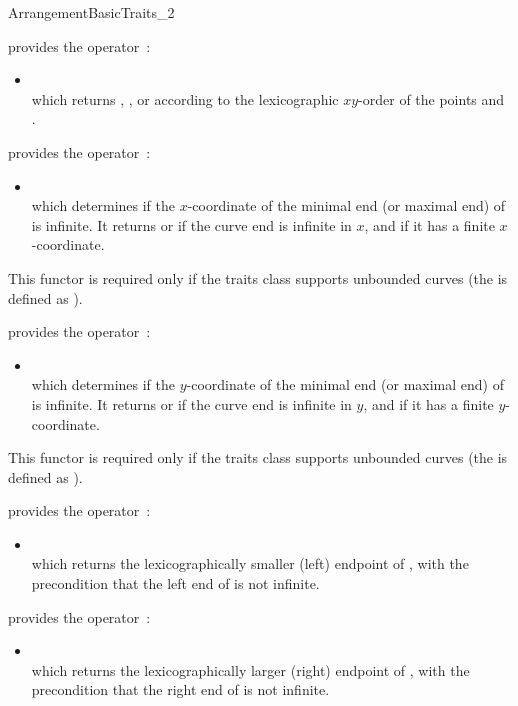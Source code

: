 \begin{ccRefConcept}{ArrangementBasicTraits_2}
{provides the operator~:
 \begin{itemize}
 \item {} \\
 which returns , , or  according to the
 lexicographic $xy$-order of the points  and .
 \end{itemize}}

{provides the operator~:
 \begin{itemize}
 \item {} \\
 which determines if the $x$-coordinate of the minimal end (or maximal end)
 of  is infinite. It returns  or 
 if the curve end is infinite in $x$, and  if it has a finite
 $x$-coordinate.
 \end{itemize}
 This functor is required only if the traits class supports unbounded curves
 (the  is defined as ).}

{provides the operator~:
 \begin{itemize}
 \item {} \\
 which determines if the $y$-coordinate of the minimal end (or maximal end)
 of  is infinite. It returns  or 
 if the curve end is infinite in $y$, and  if it has a finite
 $y$-coordinate.
 \end{itemize}
 This functor is required only if the traits class supports unbounded curves
 (the  is defined as ).}

{provides the operator~:
 \begin{itemize}
 \item {} \\
 which returns the lexicographically smaller (left) endpoint of ,
 with the precondition that the left end of  is not infinite.
 \end{itemize}}

{provides the operator~:
 \begin{itemize}
 \item {} \\
 which returns the lexicographically larger (right) endpoint of ,
 with the precondition that the right end of  is not infinite.
 \end{itemize}}


\end{ccRefConcept}
